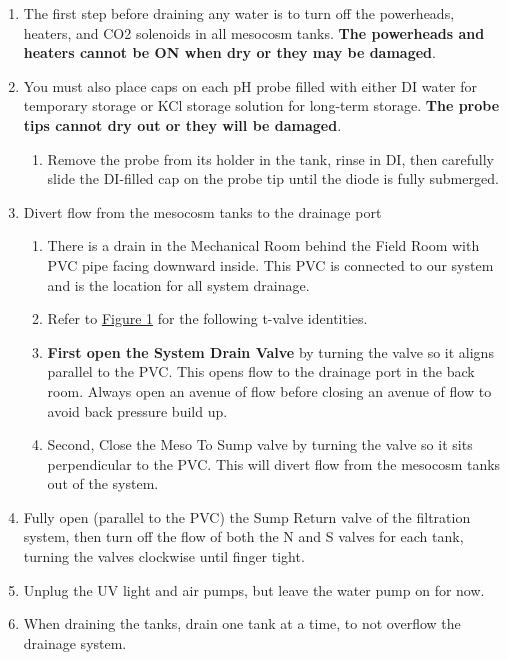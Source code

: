 \documentclass[
]{book}
\providecommand{\tightlist}{%
  \setlength{\itemsep}{0pt}\setlength{\parskip}{0pt}}
\begin{document}
\begin{enumerate}
\def\labelenumi{\arabic{enumi}.}
\tightlist
\item
  The first step before draining any water is to turn off the powerheads, heaters, and CO2 solenoids in all mesocosm tanks. \textbf{The powerheads and heaters cannot be ON when dry or they may be damaged}.
\item
  You must also place caps on each pH probe filled with either DI water for temporary storage or KCl storage solution for long-term storage. \textbf{The probe tips cannot dry out or they will be damaged}.

  \begin{enumerate}
  \def\labelenumii{\arabic{enumii}.}
  \tightlist
  \item
    Remove the probe from its holder in the tank, rinse in DI, then carefully slide the DI-filled cap on the probe tip until the diode is fully submerged.
  \end{enumerate}
\item
  Divert flow from the mesocosm tanks to the drainage port

  \begin{enumerate}
  \def\labelenumii{\arabic{enumii}.}
  \tightlist
  \item
    There is a drain in the Mechanical Room behind the Field Room with PVC pipe facing downward inside. This PVC is connected to our system and is the location for all system drainage.
  \item
    Refer to \protect\hyperlink{Figure1}{Figure 1} for the following t-valve identities.
  \item
    \textbf{First open the System Drain Valve} by turning the valve so it aligns parallel to the PVC. This opens flow to the drainage port in the back room. Always open an avenue of flow before closing an avenue of flow to avoid back pressure build up.
  \item
    Second, Close the Meso To Sump valve by turning the valve so it sits perpendicular to the PVC. This will divert flow from the mesocosm tanks out of the system.
  \end{enumerate}
\item
  Fully open (parallel to the PVC) the Sump Return valve of the filtration system, then turn off the flow of both the N and S valves for each tank, turning the valves clockwise until finger tight.
\item
  Unplug the UV light and air pumps, but leave the water pump on for now.
\item
  When draining the tanks, drain one tank at a time, to not overflow the drainage system.


\end{enumerate}
\end{document}
